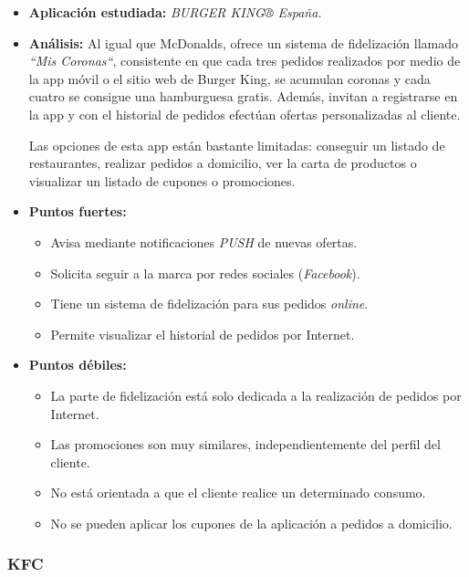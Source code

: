 \documentclass[twoside]{report}
\begin{document}
\begin{itemize}
\item \textbf{Aplicación estudiada:} \cite{burgerk} \textit{BURGER KING® España.}
\item \textbf{Análisis:} 
Al igual que McDonalds, ofrece un sistema de fidelización llamado \textit{“Mis Coronas“}, consistente en que cada tres pedidos realizados por medio de la app móvil o el sitio web de Burger King, se acumulan coronas y cada cuatro se consigue una hamburguesa gratis. Además, invitan a registrarse en la app y con el historial de pedidos efectúan ofertas personalizadas al cliente.

Las opciones de esta app están bastante limitadas: conseguir un listado de restaurantes, realizar pedidos a domicilio, ver la carta de productos o visualizar un listado de cupones o promociones.

\item \textbf{Puntos fuertes:}
	\begin{itemize}
	\item Avisa mediante notificaciones \textit{PUSH} de nuevas ofertas.
	\item Solicita seguir a la marca por redes sociales (\textit{Facebook}).
	\item Tiene un sistema de fidelización para sus pedidos \textit{online}.
	\item Permite visualizar el historial de pedidos por Internet.
	\end{itemize}
\item \textbf{Puntos débiles:}
	\begin{itemize}
		\item La parte de fidelización está solo dedicada a la realización de pedidos por Internet.
		\item Las promociones son muy similares, independientemente del perfil del cliente.
		\item No está orientada a que el cliente realice un determinado consumo.
		\item No se pueden aplicar los cupones de la aplicación a pedidos a domicilio.
	\end{itemize}
\end{itemize}

\subsubsection{KFC}
\end{document}
